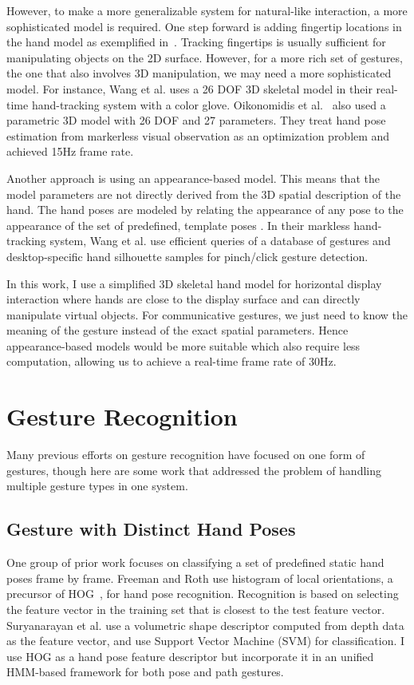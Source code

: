 However, to make a more generalizable system for natural-like interaction, a
more sophisticated model is required. One step forward is adding fingertip
locations in the hand model as exemplified in~\cite{Oka02, harrison11,
larson11}.
Tracking fingertips is usually sufficient for manipulating objects on the 2D surface. However, for a more rich set of gestures, the one
that also involves 3D manipulation, we may need a more sophisticated
model. For instance, Wang et al. \cite{Wang09} uses a 26 DOF
3D skeletal model in their real-time hand-tracking system with a color glove.
Oikonomidis et al.~\cite{oikonomidis11} also used a parametric 3D model with 26
DOF and 27 parameters. They treat hand pose estimation from markerless visual
observation as an optimization problem and achieved 15Hz frame rate.

Another approach is using an appearance-based model. This means that the model
parameters are not directly derived from the 3D spatial description of the hand.
The hand poses are modeled by relating the appearance of any pose to the 
appearance of the set of predefined, template poses \cite{Pavlovic97}. In
their markless hand-tracking system, Wang et al. \cite{wang11} use efficient
queries of a database of gestures and desktop-specific hand silhouette samples
for pinch/click gesture detection.

In this work, I use a simplified 3D
skeletal hand model for horizontal display interaction where hands are close
to the display surface and can directly manipulate virtual objects.
For communicative gestures, we just need to know the meaning of the gesture instead
of the exact spatial parameters. Hence appearance-based models would be
more suitable which also require less computation, allowing us to achieve
a real-time frame rate of 30Hz.

\section{Gesture Recognition}
Many previous efforts on gesture recognition have focused on one form of
gestures, though here are some work that addressed the problem of handling multiple gesture types in one system.

\subsection{Gesture with Distinct Hand Poses}
One group of prior work focuses on classifying a set of predefined static hand
poses frame by frame. Freeman and Roth \cite{freeman95} use histogram of local
orientations, a precursor of HOG~\cite{dalal05},
for hand pose recognition.
Recognition is based on selecting the feature vector in the training set that is closest to the test feature vector. Suryanarayan et al. \cite{suryanarayan2010} use a volumetric shape
descriptor computed from depth data as the feature vector, and use Support
Vector Machine (SVM) for classification.  I use HOG as a hand pose feature
descriptor but incorporate it in an unified HMM-based framework for both pose
and path gestures.

